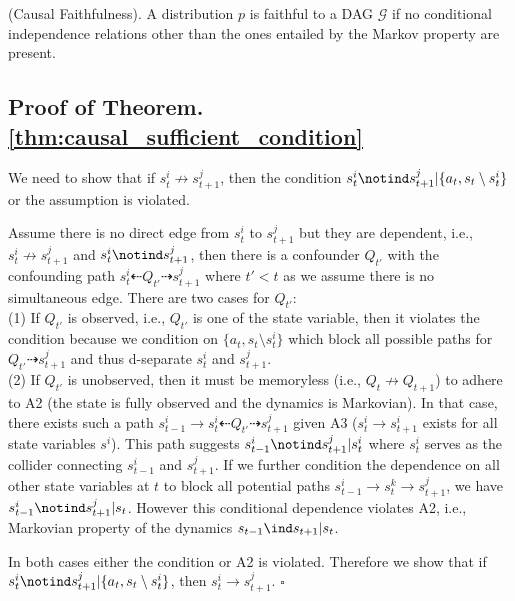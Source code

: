 \begin{definition}
\label{def:causal_faithfulness}
(Causal Faithfulness). A distribution $p$ is faithful to a DAG $\mathcal{G}$ if no conditional independence relations other than the ones entailed by the Markov property are present.
\end{definition}

\subsection{Proof of Theorem. \ref{thm:causal_sufficient_condition}}
\label{app:theorem_proof}

We need to show that if $s_t^i \not\to s_{t+1}^j$, then the condition $s_t^i \notind s^j_{t+1} | \{a_t, s_t \setminus s^i_t\}$ or the assumption is violated.

Assume there is no direct edge from $s_t^i$ to $s_{t+1}^j$ but they are dependent, i.e., $s_t^i \not\to s_{t+1}^j$ and $s_t^i \notind s_{t+1}^j$, then there is a confounder $Q_{t'}$ with the confounding path $s_t^i \dashleftarrow Q_{t'} \dashrightarrow s_{t+1}^j$ where $t' < t$ as we assume there is no simultaneous edge. There are two cases for $Q_{t'}$:\\
(1) If $Q_{t'}$ is observed, i.e., $Q_{t'}$ is one of the state variable, then it violates the condition because we condition on $\{a_t, s_t \setminus s^i_t\}$ which block all possible paths for $Q_{t'} \dashrightarrow s_{t+1}^j$ and thus d-separate $s_t^i$ and $s_{t+1}^j$. \\
(2) If $Q_{t'}$ is unobserved, then it must be memoryless (i.e., $Q_{t} \not\to Q_{t + 1}$) to adhere to A2 (the state is fully observed and the dynamics is Markovian). In that case, there exists such a path $s_{t-1}^i \rightarrow s_t^i \dashleftarrow Q_{t'} \dashrightarrow s_{t+1}^j$ given A3 ($s_t^i \rightarrow s^i_{t+1}$ exists for all state variables $s^i$). This path suggests $s_{t-1}^i \notind s_{t+1}^j | s_t^i$ where $s_t^i$ serves as the collider connecting $s_{t-1}^i$ and $s_{t+1}^j$. If we further condition the dependence on all other state variables at $t$ to block all potential paths $s_{t-1}^i \rightarrow s^k_{t} \rightarrow s_{t+1}^j$, we have $s_{t-1}^i \notind s_{t+1}^j | s_t$. However this conditional dependence violates A2, i.e., Markovian property of the dynamics $s_{t-1} \ind s_{t+1} | s_t$.

In both cases either the condition or A2 is violated. Therefore we show that if $s_t^i \notind s^j_{t+1} | \{a_t, s_t \setminus s^i_t\}$, then $s_t^i \rightarrow s^j_{t+1}$. \hfill$\square$

